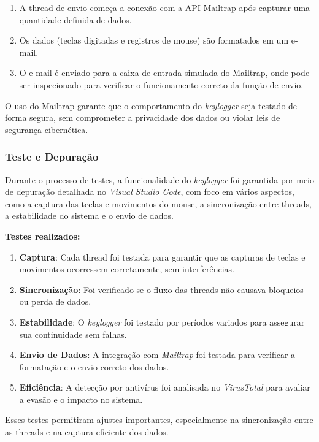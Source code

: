 \documentclass[12pt]{article}
\begin{document}
\begin{enumerate}
    \item A thread de envio começa a conexão com a API Mailtrap após capturar uma quantidade definida de dados.
    \item Os dados (teclas digitadas e registros de mouse) são formatados em um e-mail.
    \item O e-mail é enviado para a caixa de entrada simulada do Mailtrap, onde pode ser inspecionado para verificar o funcionamento correto da função de envio.
\end{enumerate}

O uso do Mailtrap garante que o comportamento do \textit{keylogger} seja testado de forma segura, sem comprometer a privacidade dos dados ou violar leis de segurança cibernética.

\subsubsection{Teste e Depuração}

Durante o processo de testes, a funcionalidade do \textit{keylogger} foi garantida por meio de depuração detalhada no \textit{Visual Studio Code}, com foco em vários aspectos, como a captura das teclas e movimentos do mouse, a sincronização entre threads, a estabilidade do sistema e o envio de dados.

\textbf{Testes realizados:}

\begin{enumerate}
    \item \textbf{Captura}: Cada thread foi testada para garantir que as capturas de teclas e movimentos ocorressem corretamente, sem interferências.
    \item \textbf{Sincronização}: Foi verificado se o fluxo das threads não causava bloqueios ou perda de dados.
    \item \textbf{Estabilidade}: O \textit{keylogger} foi testado por períodos variados para assegurar sua continuidade sem falhas.
    \item \textbf{Envio de Dados}: A integração com \textit{Mailtrap} foi testada para verificar a formatação e o envio correto dos dados.
    \item \textbf{Eficiência}: A detecção por antivírus foi analisada no \textit{VirusTotal} para avaliar a evasão e o impacto no sistema.
\end{enumerate}

Esses testes permitiram ajustes importantes, especialmente na sincronização entre as threads e na captura eficiente dos dados.
\end{document}
